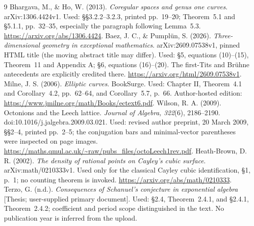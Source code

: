 \documentclass[11pt,reqno]{amsart}
\theoremstyle{definition}\newtheorem{definition}[theorem]{Definition}
\theoremstyle{remark}\newtheorem{remark}[theorem]{Remark}
\begin{document}
\begin{thebibliography}{9}
Bhargava, M., \& Ho, W. (2013). \emph{Coregular spaces and genus one curves}.
 arXiv:1306.4424v1. Used: \S\S3.2.2--3.2.3, printed pp.~19--20;
 Theorem~5.1 and \S5.1.1, pp.~32--35, especially the paragraph following
 Lemma~5.3. \url{https://arxiv.org/abs/1306.4424}.
Baez, J. C., \& Pumpl\"un, S. (2026). \emph{Three-dimensional geometry in
 exceptional mathematics}. arXiv:2609.07538v1, pinned HTML title (the moving
 abstract title may differ). Used: \S5, equations (10)--(15), Theorem~11 and
 Appendix A; \S6, equations (16)--(20). The first-Tits and Br\"uhne antecedents
 are explicitly credited there. \url{https://arxiv.org/html/2609.07538v1}.
Milne, J. S. (2006). \emph{Elliptic curves}. BookSurge.
 Used: Chapter II, Theorem~4.1 and Corollary~4.2, pp.~62--64, and
 Corollary~5.7, p.~66. Author-hosted edition:
 \url{https://www.jmilne.org/math/Books/ectext6.pdf}.
Wilson, R. A. (2009). Octonions and the Leech lattice.
 \emph{Journal of Algebra, 322}(6), 2186--2190.
 doi:10.1016/j.jalgebra.2009.03.021. Used: revised author preprint,
 20 March 2009, \S\S2--4, printed pp.~2--5; the conjugation bars and
 minimal-vector parentheses were inspected on page images.
 \url{https://maths.qmul.ac.uk/~raw/pubs_files/octoLeech1rev.pdf}.
Heath-Brown, D. R. (2002). \emph{The density of rational points on Cayley's
 cubic surface}. arXiv:math/0210333v1. Used only for the classical Cayley
 cubic identification, \S1, p.~1; no counting theorem is invoked.
 \url{https://arxiv.org/abs/math/0210333}.
Terzo, G. (n.d.). \emph{Consequences of Schanuel's conjecture in exponential
 algebra} [Thesis; user-supplied primary document]. Used: \S2.4,
 Theorem~2.4.1, and \S2.4.1, Theorem~2.4.2; coefficient and period scope
 distinguished in the text. No publication year is inferred from the upload.
\end{thebibliography}
\end{document}
